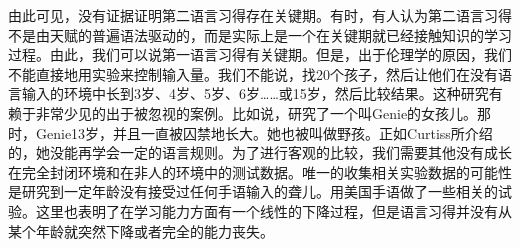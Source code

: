由此可见，没有证据证明第二语言习得存在关键期。有时，有人认为第二语言习得不是由天赋的普遍语法驱动的，而是实际上是一个在关键期就已经接触知识的学习过程\citep[]{Lenneberg67a-u}。由此，我们可以说第一语言习得有关键期。但是，出于伦理学的原因，我们不能直接地用实验来控制输入量。我们不能说，找20个孩子，然后让他们在没有语言输入的环境中长到3岁、4岁、5岁、6岁……或15岁，然后比较结果。这种研究有赖于非常少见的出于被忽视的案例。比如说，\citet{Curtiss77a-u}研究了一个叫Genie的女孩儿。那时，Genie13岁，并且一直被囚禁地长大。她也被叫做野孩。正如Curtiss所介绍的，她没能再学会一定的语言规则。为了进行客观的比较，我们需要其他没有成长在完全封闭环境和在非人的环境中的测试数据。唯一的收集相关实验数据的可能性是研究到一定年龄没有接受过任何手语输入的聋儿。\citet[]{JN89a}用美国手语做了一些相关的试验。这里也表明了在学习能力方面有一个线性的下降过程，但是语言习得并没有从某个年龄就突然下降或者完全的能力丧失。

